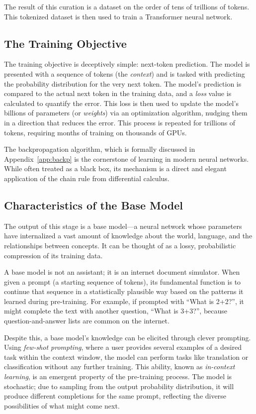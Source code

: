 \documentclass[%
  reprint,
  superscriptaddress,
  showpacs,
  showkeys,
  amsmath,amssymb,
  pra,
  longbibliography,
  floatfix,
  x11names
]{revtex4-2}
\begin{document}
The result of this curation is a dataset on the order of tens of trillions of tokens. This tokenized dataset is then used to train a Transformer neural network.

\subsection{The Training Objective}

The training objective is deceptively simple: next-token prediction.
The model is presented with a sequence of tokens (the \textit{context})
and is tasked with predicting the probability distribution for the very next token. The model's prediction is compared to the actual next token in the training data, and a \textit{loss} value is calculated to quantify the error. This loss is then used to update the model's billions of parameters (or \textit{weights}) via an optimization algorithm, nudging them in a direction that reduces the error. This process is repeated for trillions of tokens, requiring months of training on thousands of GPUs.

The backpropagation algorithm, which is formally discussed in Appendix~\ref{app:backp} is the cornerstone of learning in modern neural networks.
While often treated as a black box,
its mechanism is a direct and elegant application of the chain rule from differential calculus.


\subsection{Characteristics of the Base Model}

The output of this stage is a base model---a neural network whose parameters have internalized a vast amount of knowledge about the world, language, and the relationships between concepts. It can be thought of as a lossy, probabilistic compression of its training data.

A base model is not an assistant; it is an internet document simulator. When given a prompt (a starting sequence of tokens), its fundamental function is to continue that sequence in a statistically plausible way based on the patterns it learned during pre-training. For example, if prompted with ``What is 2+2?'', it might complete the text with another question, ``What is 3+3?'', because question-and-answer lists are common on the internet.

Despite this, a base model's knowledge can be elicited through clever prompting. Using \textit{few-shot prompting}, where a user provides several examples of a desired task within the context window, the model can perform tasks like translation or classification without any further training. This ability, known as \textit{in-context learning}, is an emergent property of the pre-training process. The model is stochastic; due to sampling from the output probability distribution, it will produce different completions for the same prompt, reflecting the diverse possibilities of what might come next.
\end{document}
